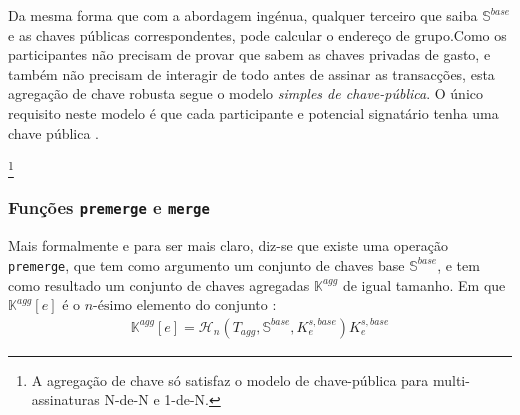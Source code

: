 
Da mesma forma que com a abordagem ingénua, qualquer terceiro que saiba $\mathbb{S}^{base}$ e as chaves públicas correspondentes, pode calcular o endereço de grupo.\newline Como os participantes não precisam de provar que sabem as chaves privadas de gasto, e também não precisam de interagir de todo antes de assinar as transacções, esta agregação de chave robusta segue o modelo {\em simples de chave-pública}. O único requisito neste modelo é que cada participante e potencial signatário tenha uma chave pública \cite{maxwell2018simple-musig}.

\footnote{A agregação de chave só satisfaz o modelo de chave-pública para multi-assinaturas N-de-N e 1-de-N.}

\subsubsection*{Funções {\tt premerge} e {\tt merge}}

Mais formalmente e para ser mais claro, diz-se que existe uma operação {\tt premerge}, que tem como argumento um conjunto de chaves base $\mathbb{S}^{base}$, e tem como resultado um conjunto de chaves agregadas $\mathbb{K}^{agg}$ de igual tamanho. Em que $\mathbb{K}^{agg}[e]$ é o $n\textrm{-ésimo}$ elemento do conjunto :
\begin{align*}
\mathbb{K}^{agg}[e] = \mathcal{H}_n(T_{agg},\mathbb{S}^{base},K^{s,base}_e)K^{s,base}_e
\end{align*}


